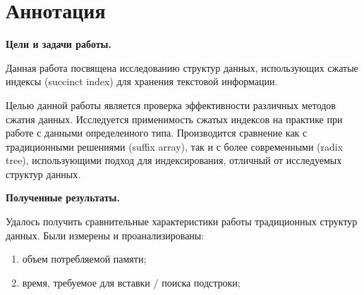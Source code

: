 \newpage
\section*{Аннотация}

\textbf{Цели и задачи работы.}

Данная работа посвящена исследованию структур данных,
использующих сжатые индексы (succinct index) для хранения текстовой информации.

Целью данной работы является проверка эффективности различных методов сжатия данных.
Исследуется применимость сжатых индексов на практике при работе с данными определенного типа.
Производится сравнение как с традиционными решениями (suffix array), так и с более современными (radix tree),
использующими подход для индексирования, отличный от исследуемых структур данных.


\textbf{Полученные результаты.}


Удалось получить сравнительные характеристики работы традиционных структур данных.
Были измерены и проанализированы:
\begin{enumerate}
    \item объем потребляемой памяти;
    \item время, требуемое для вставки / поиска подстроки;
\end{enumerate}



